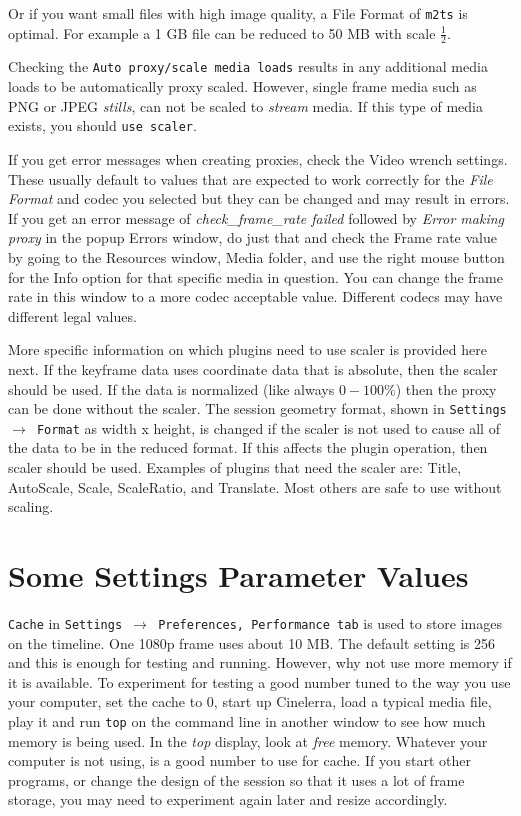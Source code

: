 Or if you want small files with high image quality, a File Format of \texttt{m2ts} is optimal.  For example a 1 GB file can be reduced to 50 MB with scale $\frac{1}{2}$. 

Checking the \texttt{Auto proxy/scale media loads} results in any additional media loads to be automatically proxy scaled.  However, single frame media such as PNG or JPEG \textit{stills}, can not be scaled to \textit{stream} media.  If this type of media exists, you should \texttt{use scaler}.

If you get error messages when creating proxies, check the Video wrench settings.  These usually default to values that are expected to work correctly for the \textit{File Format} and codec you selected but they can be changed and may result in errors.  If you get an error message of \textit{check\_frame\_rate failed} followed by \textit{Error making proxy} in the popup Errors window, do just that and check the Frame rate value by going to the Resources window, Media folder, and use the right mouse button for the Info option for that specific media in question.  You can change the frame rate in this window to a more codec acceptable value.  Different codecs may have different legal values.

More specific information on which plugins need to use scaler is provided here next.  If the keyframe data uses coordinate data that is absolute, then the scaler should be used.  If the data is normalized (like always $0-100\%$) then the proxy can be done without the scaler.  The session geometry format, shown in \texttt{Settings $\rightarrow$ Format} as width x height, is changed if the scaler is not used to cause all of the data to be in the reduced format.  If this affects the plugin operation, then scaler should be used.  Examples of plugins that need the scaler are: Title, AutoScale, Scale, ScaleRatio, and Translate.  Most others are safe to use without scaling.

\section{Some Settings Parameter Values}%
\label{sec:settings_parameter_values}

\texttt{Cache} in \texttt{Settings $\rightarrow$ Preferences, Performance tab} is used to store images on the timeline.  One 1080p frame uses about 10 MB.  The default setting is 256 and this is enough for testing and running.  However, why not use more memory if it is available.   To experiment for testing a good number tuned to the way you use your computer, set the cache to 0, start up Cinelerra, load a typical media file, play it and run \texttt{top} on the command line in another window to see how much memory is being used.  In the \textit{top} display, look at \textit{free} memory.  Whatever your computer is not using, is a good number to use for cache.  If you start other programs, or change the design of the session so that it uses a lot of frame storage, you may need to experiment again later and resize accordingly.

